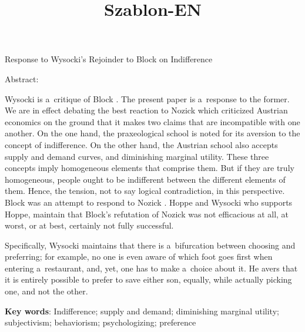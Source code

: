 \setcounter{secnumdepth}{1}



\title{Szablon-EN}



Response to Wysocki's Rejoinder to Block on Indifference





Abstract:



Wysocki 
\parencite*[][]{wysocki_rejoinder_2024} %
 is a~critique of Block 
\parencite*[][]{block_response_2022}. %
 The present paper is a~response to the former. We are in effect debating the best reaction to Nozick 
\parencite*[][]{nozick_austrian_1977} %
 which criticized Austrian economics on the ground that it makes two claims that are incompatible with one another. On the one hand, the praxeological school is noted for its aversion to the concept of indifference. On the other hand, the Austrian school also accepts supply and demand curves, and diminishing marginal utility. These three concepts imply homogeneous elements that comprise them. But if they are truly homogeneous, people ought to be indifferent between the different elements of them. Hence, the tension, not to say logical contradiction, in this perspective. Block 
\parencite*[][]{block_robert_1980} %
 was an attempt to respond to Nozick 
\parencite*[][]{nozick_austrian_1977}. %
 Hoppe 
\parencites*[][]{hoppe_note_2005}[][]{hoppe_must_2005}[][]{hoppe_further_2009} %
 and Wysocki 
\parencites*[][]{}[][]{}[][]{}[][]{} %
 who supports Hoppe, maintain that Block's refutation of Nozick 
\parencite*[][]{nozick_austrian_1977} %
 was not efficacious at all, at worst, or at best, certainly not fully successful.



Specifically, Wysocki maintains that there is a~bifurcation between choosing and preferring; for example, no one is even aware of which foot goes first when entering a~restaurant, and, yet, one has to make a~choice about it. He avers that it is entirely possible to prefer to save either son, equally, while actually picking one, and not the other.



\textbf{Key words}: Indifference; supply and demand; diminishing marginal utility; subjectivism; behaviorism; psychologizing; preference



